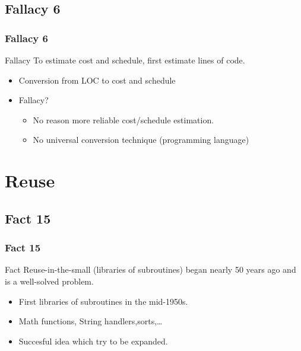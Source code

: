 \documentclass{beamer}
\begin{document}
\subsection{Fallacy 6}
\begin{frame}
    \frametitle{Fallacy 6}
    \begin{block}{Fallacy}
    To estimate cost and schedule, first estimate lines of code.
    \end{block}
    \begin{itemize}
    		\item Conversion from LOC to cost and schedule
    		\item Fallacy?
    		\begin{itemize}
    			\item No reason more reliable cost/schedule estimation.
    			\item No universal conversion technique (programming language)	
    		\end{itemize}
    \end{itemize}
\end{frame}

\section{Reuse}

\subsection{Fact 15}
\begin{frame}
    \frametitle{Fact 15}
    \begin{block}{Fact}
    Reuse-in-the-small (libraries of subroutines) began nearly 50 years ago and
    is a well-solved problem.
    \end{block}
    \begin{itemize}
    		\item First libraries of subroutines in the mid-1950s.
    		\item Math functions, String handlers,sorts,\ldots
    		\item Succesful idea which try to be expanded.
    \end{itemize}
\end{frame}
\end{document}
